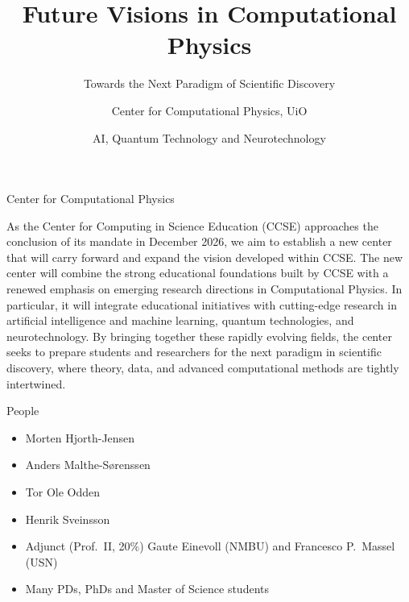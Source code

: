 \documentclass{beamer}
\title{Future Visions in Computational Physics}
\subtitle{Towards the Next Paradigm of Scientific Discovery}
\author{Center for Computational Physics, UiO}
\date{AI, Quantum Technology and Neurotechnology}
\begin{document}
\frame{\titlepage}


\begin{frame}{Center for Computational Physics}

As the Center for Computing in Science Education (CCSE) approaches the
conclusion of its mandate in December 2026, we aim to establish a new
center that will carry forward and expand the vision developed within
CCSE. The new center will combine the strong educational foundations
built by CCSE with a renewed emphasis on emerging research directions
in Computational Physics. In particular, it will integrate educational
initiatives with cutting-edge research in artificial intelligence and
machine learning, quantum technologies, and 
neurotechnology. By bringing together these rapidly evolving fields, the
center seeks to prepare students and researchers for the next paradigm
in scientific discovery, where theory, data, and advanced
computational methods are tightly intertwined.

\end{frame}

\begin{frame}{People}
  \begin{itemize}
  \item Morten Hjorth-Jensen
  \item Anders Malthe-Sørenssen
  \item Tor Ole Odden
  \item Henrik Sveinsson
  \item Adjunct (Prof.~II, 20$\%$) Gaute Einevoll (NMBU) and Francesco P.~Massel (USN)
  \item Many PDs, PhDs and Master of Science students
   \end{itemize}
\end{frame}
\end{document}
